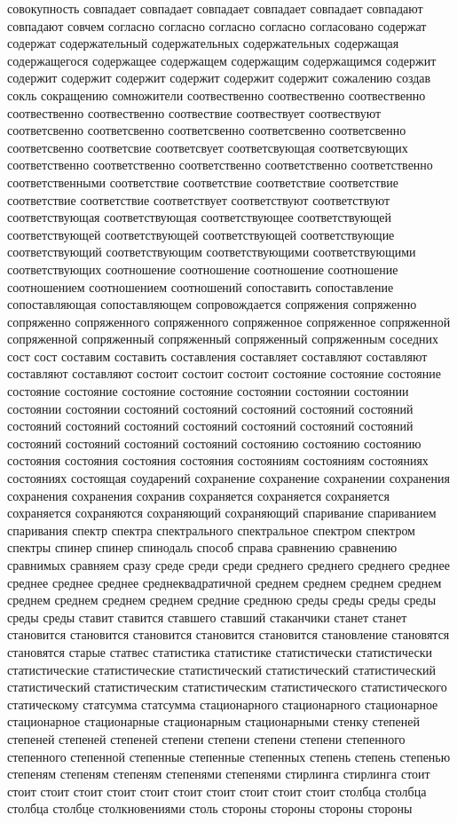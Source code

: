 совокупность совпадает совпадает совпадает совпадает совпадает совпадают совпадают совчем согласно согласно согласно согласно согласовано содержат содержат содержательный содержательных содержательных содержащая содержащегося содержащее содержащем содержащим содержащимся содержит содержит содержит содержит содержит содержит содержит сожалению создав сокль сокращению сомножители соотвественно соотвественно соотвественно соотвественно соотвественно соотвествие соотвествует соотвествуют соответсвенно соответсвенно соответсвенно соответсвенно соответсвенно соответсвенно соответсвие соответсвует соответсвующая соответсвующих соответственно соответственно соответственно соответственно соответственно соответственными соответствие соответствие соответствие соответствие соответствие соответствие соответствует соответствуют соответствуют соответствующая соответствующая соответствующее соответствующей соответствующей соответствующей соответствующей соответствующие соответствующий соответствующим соответствующими соответствующими соответствующих соотношение соотношение соотношение соотношение соотношением соотношением соотношений сопоставить сопоставление сопоставляющая сопоставляющем сопровождается сопряжения сопряженно сопряженно сопряженного сопряженного сопряженное сопряженное сопряженной сопряженной сопряженный сопряженный сопряженный сопряженным соседних сост сост составим составить составления составляет составляют составляют составляют составляют состоит состоит состоит состояние состояние состояние состояние состояние состояние состояние состоянии состоянии состоянии состоянии состоянии состояний состояний состояний состояний состояний состояний состояний состояний состояний состояний состояний состояний состояний состояний состояний состояний состоянию состоянию состоянию состояния состояния состояния состояния состояниям состояниям состояниях состояниях состоящая соударений сохранение сохранение сохранении сохранения сохранения сохранения сохранив сохраняется сохраняется сохраняется сохраняется сохраняются сохраняющий сохраняющий спаривание спариванием спаривания спектр спектра спектрального спектральное спектром спектром спектры спинер спинер спинодаль способ справа сравнению сравнению сравнимых сравняем сразу среде среди среди среднего среднего среднего среднее среднее среднее среднее среднеквадратичной среднем среднем среднем среднем среднем среднем среднем среднем средние среднюю среды среды среды среды среды среды ставит ставится ставшего ставший стаканчики станет станет становится становится становится становится становится становление становятся становятся старые статвес статистика статистике статистически статистически статистические статистические статистический статистический статистический статистический статистическим статистическим статистического статистического статическому статсумма статсумма стационарного стационарного стационарное стационарное стационарные стационарным стационарными стенку степеней степеней степеней степеней степени степени степени степени степенного степенного степенной степенные степенные степенных степень степень степенью степеням степеням степеням степенями степенями стирлинга стирлинга стоит стоит стоит стоит стоит стоит стоит стоит стоит стоит стоит столбца столбца столбца столбце столкновениями столь стороны стороны стороны стороны 